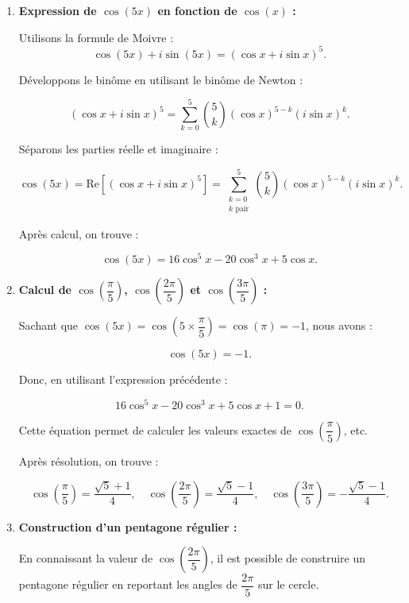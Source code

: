 \documentclass[a4paper,12pt]{article}
\begin{document}
\begin{solutionbox}
\begin{enumerate}
    \item \textbf{Expression de \( \cos(5x) \) en fonction de \( \cos(x) \) :}

    Utilisons la formule de Moivre :
    \[
    \cos(5x) + i\sin(5x) = (\cos x + i\sin x)^5.
    \]

    Développons le binôme en utilisant le binôme de Newton :

    \[
    (\cos x + i\sin x)^5 = \sum_{k=0}^{5} \binom{5}{k} (\cos x)^{5 - k} (i\sin x)^k.
    \]

    Séparons les parties réelle et imaginaire :

    \[
    \cos(5x) = \text{Re} \left[ (\cos x + i\sin x)^5 \right] = \sum_{\substack{k=0 \\ k \text{ pair}}}^{5} \binom{5}{k} (\cos x)^{5 - k} (i\sin x)^k.
    \]

    Après calcul, on trouve :

    \[
    \cos(5x) = 16 \cos^5 x - 20 \cos^3 x + 5 \cos x.
    \]

    \item \textbf{Calcul de \( \cos \left( \dfrac{\pi}{5} \right) \), \( \cos \left( \dfrac{2\pi}{5} \right) \) et \( \cos \left( \dfrac{3\pi}{5} \right) \) :}

    Sachant que \( \cos(5x) = \cos(5 \times \dfrac{\pi}{5}) = \cos(\pi) = -1 \), nous avons :

    \[
    \cos(5x) = -1.
    \]

    Donc, en utilisant l'expression précédente :

    \[
    16 \cos^5 x - 20 \cos^3 x + 5 \cos x + 1 = 0.
    \]

    Cette équation permet de calculer les valeurs exactes de \( \cos \left( \dfrac{\pi}{5} \right) \), etc.

    Après résolution, on trouve :

    \[
    \cos \left( \dfrac{\pi}{5} \right) = \dfrac{\sqrt{5} + 1}{4}, \quad \cos \left( \dfrac{2\pi}{5} \right) = \dfrac{\sqrt{5} - 1}{4}, \quad \cos \left( \dfrac{3\pi}{5} \right) = -\dfrac{\sqrt{5} - 1}{4}.
    \]

    \item \textbf{Construction d'un pentagone régulier :}

    En connaissant la valeur de \( \cos \left( \dfrac{2\pi}{5} \right) \), il est possible de construire un pentagone régulier en reportant les angles de \( \dfrac{2\pi}{5} \) sur le cercle.


\end{enumerate}
\end{solutionbox}
\end{document}
